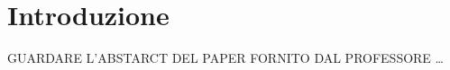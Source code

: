 \chapter{Introduzione}\label{ch:introduzione}
GUARDARE L'ABSTARCT DEL PAPER FORNITO DAL PROFESSORE 
\ldots
\cite{gruntzig1978transluminal}